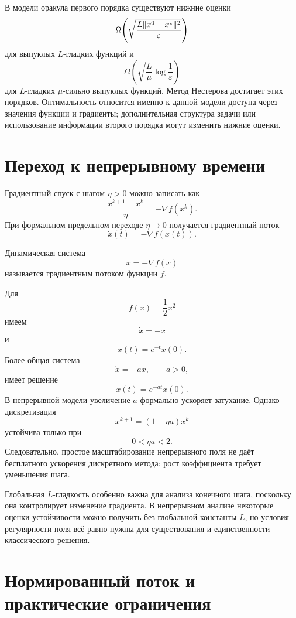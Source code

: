В модели оракула первого порядка существуют нижние оценки
\[
    \Omega\!\left(
        \sqrt{
            \frac{
                L\lVert x^0-x^\star\rVert^2
            }{
                \varepsilon
            }
        }
    \right)
\]
для выпуклых \(L\)-гладких функций и
\[
    \Omega\!\left(
        \sqrt{\frac L\mu}
        \log\frac1\varepsilon
    \right)
\]
для \(L\)-гладких \(\mu\)-сильно выпуклых функций. Метод Нестерова
достигает этих порядков. Оптимальность относится именно к данной
модели доступа через значения функции и градиенты; дополнительная
структура задачи или использование информации второго порядка могут
изменить нижние оценки.

\section{Переход к непрерывному времени}

Градиентный спуск с шагом \(\eta>0\) можно записать как
\[
    \frac{x^{k+1}-x^k}{\eta}
    =
    -\nabla f(x^k).
\]
При формальном предельном переходе \(\eta\to0\) получается градиентный
поток
\[
    \dot x(t)
    =
    -\nabla f(x(t)).
\]

\begin{definition}
Динамическая система
\[
    \dot x=-\nabla f(x)
\]
называется градиентным потоком функции \(f\).
\end{definition}

Для
\[
    f(x)=\frac12x^2
\]
имеем
\[
    \dot x=-x
\]
и
\[
    x(t)=e^{-t}x(0).
\]
Более общая система
\[
    \dot x=-ax,
    \qquad
    a>0,
\]
имеет решение
\[
    x(t)=e^{-at}x(0).
\]
В непрерывной модели увеличение \(a\) формально ускоряет затухание.
Однако дискретизация
\[
    x^{k+1}
    =
    (1-\eta a)x^k
\]
устойчива только при
\[
    0<\eta a<2.
\]
Следовательно, простое масштабирование непрерывного поля не даёт
бесплатного ускорения дискретного метода: рост коэффициента требует
уменьшения шага.

Глобальная \(L\)-гладкость особенно важна для анализа конечного шага,
поскольку она контролирует изменение градиента. В непрерывном анализе
некоторые оценки устойчивости можно получить без глобальной
константы \(L\), но условия регулярности поля всё равно нужны для
существования и единственности классического решения.

\section{Нормированный поток и практические ограничения}


